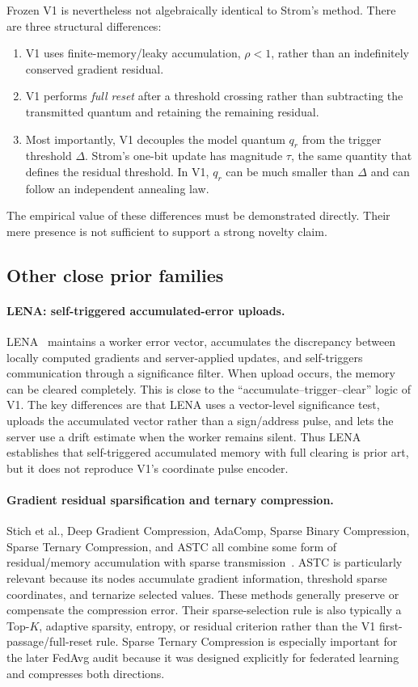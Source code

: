 Frozen V1 is nevertheless not algebraically identical to Strom's method. There are three structural differences:
\begin{enumerate}
    \item V1 uses finite-memory/leaky accumulation, $\rho<1$, rather than an indefinitely conserved gradient residual.
    \item V1 performs \emph{full reset} after a threshold crossing rather than subtracting the transmitted quantum and retaining the remaining residual.
    \item Most importantly, V1 decouples the model quantum $q_r$ from the trigger threshold $\Delta$. Strom's one-bit update has magnitude $\tau$, the same quantity that defines the residual threshold. In V1, $q_r$ can be much smaller than $\Delta$ and can follow an independent annealing law.
\end{enumerate}
The empirical value of these differences must be demonstrated directly. Their mere presence is not sufficient to support a strong novelty claim.

\subsection{Other close prior families}

\paragraph{LENA: self-triggered accumulated-error uploads.}
LENA~\cite{ghadikolaei2021lena} maintains a worker error vector, accumulates the discrepancy between locally computed gradients and server-applied updates, and self-triggers communication through a significance filter. When upload occurs, the memory can be cleared completely. This is close to the ``accumulate--trigger--clear'' logic of V1. The key differences are that LENA uses a vector-level significance test, uploads the accumulated vector rather than a sign/address pulse, and lets the server use a drift estimate when the worker remains silent. Thus LENA establishes that self-triggered accumulated memory with full clearing is prior art, but it does not reproduce V1's coordinate pulse encoder.

\paragraph{Gradient residual sparsification and ternary compression.}
Stich et al., Deep Gradient Compression, AdaComp, Sparse Binary Compression, Sparse Ternary Compression, and ASTC all combine some form of residual/memory accumulation with sparse transmission~\cite{stich2018memory,lin2017dgc,chen2018adacomp,sattler2019sbc,sattler2019stc,mao2022astc}. ASTC is particularly relevant because its nodes accumulate gradient information, threshold sparse coordinates, and ternarize selected values. These methods generally preserve or compensate the compression error. Their sparse-selection rule is also typically a Top-$K$, adaptive sparsity, entropy, or residual criterion rather than the V1 first-passage/full-reset rule. Sparse Ternary Compression is especially important for the later FedAvg audit because it was designed explicitly for federated learning and compresses both directions.

